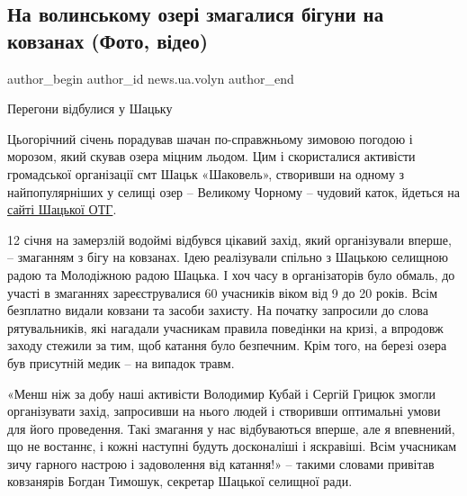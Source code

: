  
 
 
 
 
\subsection{На волинському озері змагалися бігуни на ковзанах (Фото, відео)}
\label{sec:13_01_2022.stz.news.ua.volyn.1.ozero_kovzany}

\ifcmt
 author_begin
   author_id news.ua.volyn
 author_end
\fi


\begin{zznagolos}
Перегони відбулися у Шацьку	
\end{zznagolos}

Цьогорічний січень порадував шачан по-справжньому зимовою погодою і морозом,
який скував озера міцним льодом. Цим і скористалися активісти громадської
організації смт Шацьк «Шаковель», створивши на одному з найпопулярніших у
селищі озер – Великому Чорному – чудовий каток, йдеться на
\href{https://shsrada.gov.ua/news/1642064840/}{сайті Шацької ОТГ}.


12 січня на замерзлій водоймі відбувся цікавий захід, який організували вперше,
–  змаганням з бігу на ковзанах. Ідею реалізували спільно з Шацькою селищною
радою та Молодіжною радою Шацька. І хоч часу в організаторів було обмаль, до
участі в змаганнях зареєструвалися 60 учасників віком від 9 до 20 років. Всім
безплатно видали ковзани та засоби захисту. На початку запросили до слова
рятувальників, які нагадали учасникам правила поведінки на кризі, а впродовж
заходу стежили за тим, щоб катання було безпечним. Крім того, на березі озера
був присутній медик – на випадок травм.


«Менш ніж за добу наші активісти Володимир Кубай і Сергій Грицюк змогли
організувати захід, запросивши на нього людей і створивши оптимальні умови для
його проведення. Такі змагання у нас відбуваються вперше, але я впевнений, що
не востаннє, і кожні наступні будуть досконаліші і яскравіші. Всім учасникам
зичу гарного настрою і задоволення від катання!» – такими словами привітав
ковзанярів Богдан Тимошук, секретар Шацької селищної ради.

